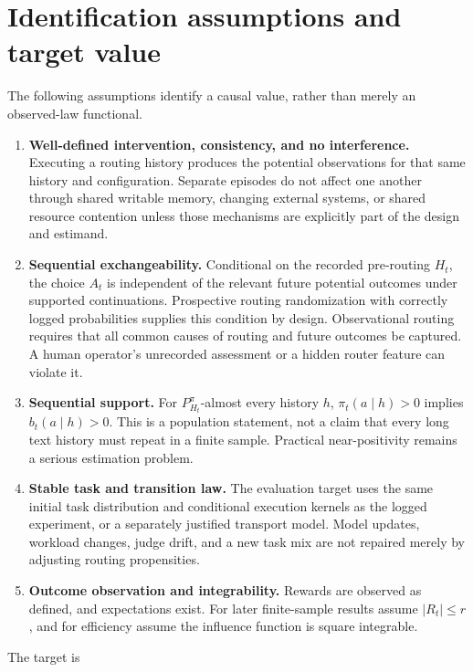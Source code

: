 \section{Identification assumptions and target value}\label{identification-assumptions-and-target-value}

The following assumptions identify a causal value, rather than merely an observed-law functional.

\begin{enumerate}
\def\labelenumi{\arabic{enumi}.}
\tightlist
\item
  \textbf{Well-defined intervention, consistency, and no interference.} Executing a routing history produces the potential observations for that same history and configuration. Separate episodes do not affect one another through shared writable memory, changing external systems, or shared resource contention unless those mechanisms are explicitly part of the design and estimand.
\item
  \textbf{Sequential exchangeability.} Conditional on the recorded pre-routing \(H_t\), the choice \(A_t\) is independent of the relevant future potential outcomes under supported continuations. Prospective routing randomization with correctly logged probabilities supplies this condition by design. Observational routing requires that all common causes of routing and future outcomes be captured. A human operator's unrecorded assessment or a hidden router feature can violate it.
\item
  \textbf{Sequential support.} For $P^{\pi}_{H_t}$-almost every history $h$, \(\pi_t(a\mid h)>0\) implies \(b_t(a\mid h)>0\). This is a population statement, not a claim that every long text history must repeat in a finite sample. Practical near-positivity remains a serious estimation problem.
\item
  \textbf{Stable task and transition law.} The evaluation target uses the same initial task distribution and conditional execution kernels as the logged experiment, or a separately justified transport model. Model updates, workload changes, judge drift, and a new task mix are not repaired merely by adjusting routing propensities.
\item
  \textbf{Outcome observation and integrability.} Rewards are observed as defined, and expectations exist. For later finite-sample results assume \(|R_t|\le r\), and for efficiency assume the influence function is square integrable.
\end{enumerate}

The target is

